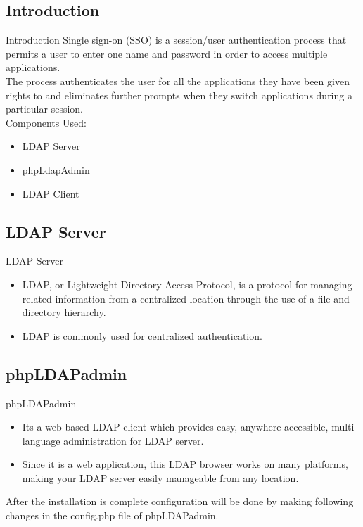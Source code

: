 \documentclass[10pt,xcolor=dvipsnames]{beamer}
\begin{document}
\subsection{Introduction}
\begin{frame}{Introduction}
	Single sign-on (SSO) is a session/user authentication process that permits a user to enter one name and password in order to access multiple applications.\\
	The process authenticates the user for all the applications they have been given rights to and eliminates further prompts when they switch applications during a particular session.\\
	Components Used:
	\begin{itemize}
	\item LDAP Server
	\item phpLdapAdmin
	\item LDAP Client
	\end{itemize}
	
\end{frame}

\subsection{LDAP Server}
\begin{frame}{LDAP Server}
	\begin{itemize}
	\item LDAP, or Lightweight Directory Access Protocol, is a protocol for managing related information from a centralized location through the use of a file and directory hierarchy.
	\item LDAP is commonly used for centralized authentication.
	\end{itemize}
\end{frame}
\subsection{phpLDAPadmin}
\begin{frame}{phpLDAPadmin}
	\begin{itemize}
	\item Its a web-based LDAP client which provides easy, anywhere-accessible, multi-language administration for LDAP server.\\
	\item Since it is a web application, this LDAP browser works on many platforms, making your LDAP server easily manageable from any location.
	\end{itemize}
	After the installation is complete configuration will be done by making following changes in the config.php file of phpLDAPadmin.

	
\end{frame}
\end{document}
